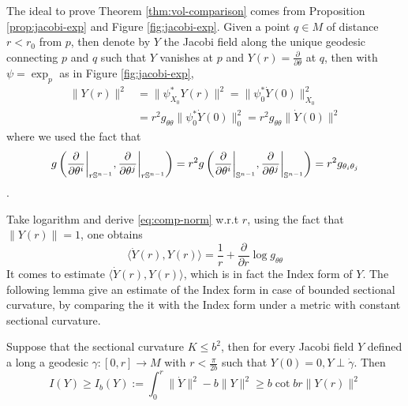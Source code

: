 The ideal to prove Theorem \ref{thm:vol-comparison} comes from Proposition
\ref{prop:jacobi-exp} and Figure \ref{fig:jacobi-exp}. Given a point \(q\in M\) of distance
\(r< r_0\) from \(p\), then denote by \(Y\) the Jacobi field along the unique
geodesic connecting \(p\) and \(q\) such that \(Y\) vanishes at \(p\) and 
\(Y(r) = \frac{\partial}{\partial \theta}\) at \(q\), then with \(\psi =\exp_p\) as in Figure \ref{fig:jacobi-exp},
\begin{equation}
\label{eq:comp-norm}
\begin{split}
\| Y(r)\|^2  &= \| \psi_{X_0}^* Y(r) \|^2 = \| \psi_0^* \dot Y(0)\|^2_{X_0}\\
     &= r^2 g_{\theta\theta} \|\psi_0^*\dot Y(0)\|_0^2 = r^2 g_{\theta\theta} \|\dot Y(0)\|^2
\end{split}   
\end{equation}
where we used the fact that
\[ g\left(\restr{\frac{\partial}{\partial \theta^i}}{r
\mathbb{S}^{n-1}},\restr{\frac{\partial}{\partial \theta^j}}{r \mathbb{S}^{n-1}}\right) = r^2
g\left(\restr{\frac{\partial}{\partial
\theta^i}}{\mathbb{S}^{n-1}},\restr{\frac{\partial}{\partial \theta^j}}{\mathbb{S}^{n-1}}\right)
= r^2 g_{\theta_i\theta_j} \].

Take logarithm and derive \eqref{eq:comp-norm} w.r.t \(r\), using the fact that
\(\|Y(r)\| = 1\), one obtains
\begin{equation}
\label{eq:comp-norm-ap}
\langle \dot Y(r), Y(r) \rangle = \frac{1}{r} + \frac{\partial}{\partial r}\log g_{\theta\theta}
\end{equation}
It comes to estimate \(\langle \dot Y(r), Y(r) \rangle\), which is in fact the Index
form of \(Y\). The following lemma give an estimate of the Index form in case of bounded
sectional curvature, by comparing the it with the Index form under a metric with constant
sectional curvature. 

\begin{lemma}
\label{lem:compare-const-sec-curv}
Suppose that the sectional curvature \(K \leq b^2\), then for every Jacobi field \(Y\)
defined a long a geodesic \(\gamma: [0,r] \longrightarrow M\) with \(r< \frac{\pi}{2b}\) such that \(Y(0)=0, Y\perp \dot\gamma\). Then
\[
 I(Y) \geq I_b(Y):=\int_0^r \| \dot Y\|^2 - b \|Y\|^2 \geq b\cot br \|Y(r)\|^2
\]
\end{lemma}

